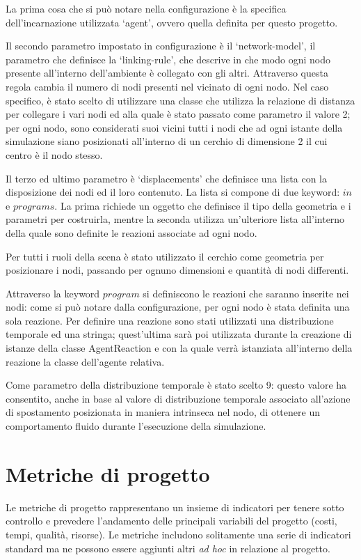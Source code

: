 La prima cosa che si può notare nella configurazione è la specifica dell'incarnazione utilizzata `agent', ovvero quella definita per questo progetto.

Il secondo parametro impostato in configurazione è il `network-model', il parametro che definisce la `linking-rule', che descrive in che modo ogni nodo presente all'interno dell'ambiente è collegato con gli altri. Attraverso questa regola cambia il numero di nodi presenti nel vicinato di ogni nodo. Nel caso specifico, è stato scelto di utilizzare una classe che utilizza la relazione di distanza per collegare i vari nodi ed alla quale è stato passato come parametro il valore 2; per ogni nodo, sono considerati suoi vicini tutti i nodi che ad ogni istante della simulazione siano posizionati all'interno di un cerchio di dimensione 2 il cui centro è il nodo stesso.

Il terzo ed ultimo parametro è `displacements' che definisce una lista con la disposizione dei nodi ed il loro contenuto.
%
La lista si compone di due keyword: $in$ e $programs$. La prima richiede un oggetto che definisce il tipo della geometria e i parametri per costruirla, mentre la seconda utilizza un'ulteriore lista all'interno della quale sono definite le reazioni associate ad ogni nodo.

Per tutti i ruoli della scena è stato utilizzato il cerchio come geometria per posizionare i nodi, passando per ognuno dimensioni e quantità di nodi differenti.

Attraverso la keyword $program$ si definiscono le reazioni che saranno inserite nei nodi: come si può notare dalla configurazione, per ogni nodo è stata definita una sola reazione.
Per definire una reazione sono stati utilizzati una distribuzione temporale ed una stringa; quest'ultima sarà poi utilizzata durante la creazione di istanze della classe AgentReaction e con la quale verrà istanziata all'interno della reazione la classe dell'agente relativa.

Come parametro della distribuzione temporale è stato scelto 9: questo valore ha consentito, anche in base al valore di distribuzione temporale associato all'azione di spostamento posizionata in maniera intrinseca nel nodo, di ottenere un comportamento fluido durante l'esecuzione della simulazione.


\section{Metriche di progetto}
Le metriche di progetto rappresentano un insieme di indicatori per tenere sotto controllo e prevedere l'andamento delle principali variabili del progetto (costi, tempi, qualità, risorse).
Le metriche includono solitamente una serie di indicatori standard ma ne possono essere aggiunti altri \textit{ad hoc} in relazione al progetto.

